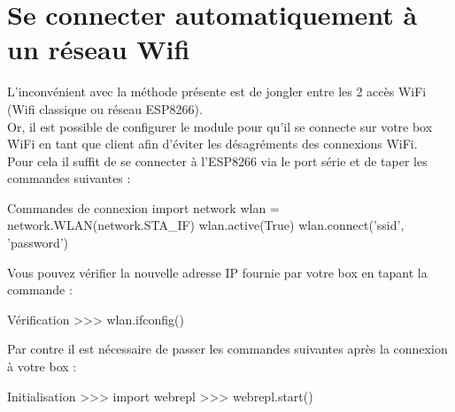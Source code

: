 \section{Se connecter automatiquement à un réseau Wifi}

L’inconvénient avec la méthode présente est de jongler entre les 2 accès WiFi (Wifi classique ou réseau ESP8266).\\
Or, il est possible de configurer le module pour qu’il se connecte sur votre box WiFi en tant que client afin d'éviter les désagréments des connexions WiFi. \\
Pour cela il suffit de se connecter à l'ESP8266 via le port série et de taper les commandes suivantes : 
\begin{Bash}{Commandes de connexion}
import network
wlan = network.WLAN(network.STA_IF)
wlan.active(True)
wlan.connect('ssid', 'password')
\end{Bash}

Vous pouvez vérifier la nouvelle adresse IP fournie par votre box en tapant la commande :
\begin{Bash}{Vérification}
>>> wlan.ifconfig()
\end{Bash}

Par contre il est nécessaire de passer les commandes suivantes après la connexion à votre box :

\begin{Bash}{Initialisation}
>>> import webrepl
>>> webrepl.start()
\end{Bash}

